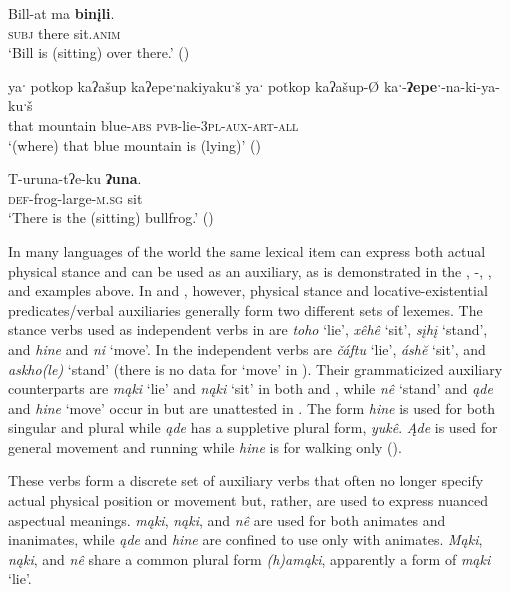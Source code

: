 \documentclass[output=paper]{LSP/langsci}
\begin{document}
\ea
\settowidth{}
\gll	Bill-at ma \textbf{binįli}.\\
	 \textsc{subj} there sit.\textsc{anim}\\ 
\glt `Bill is (sitting) over there.' (\citealt[21]{Watkins1976})
\z
		
\ea	
\settowidth{} 
yaˑ potkop kaʔašup kaʔepeˑnakiyakuˑš 
\gll		yaˑ potkop kaʔašup-Ø kaˑ-\textbf{ʔepeˑ}-na-ki-ya-kuˑš\\
		that mountain blue-\textsc{abs} \textsc{pvb}-lie-\textsc{3pl-aux-art-all}\\
\glt	`(where) that blue mountain is (lying)' (\citealt[438]{Kimball2005})
\z

\ea
\settowidth{}
\gll	T-uruna-tʔe-ku 	\textbf{ʔuna}.\\
 \textsc{def}-frog-large-\textsc{m.sg} sit\\ 
\glt `There is the (sitting) bullfrog.' (\citealt[26]{Watkins1976})
\z

In many languages of the world the same lexical item can express both actual physical stance and can be used as an auxiliary, as is demonstrated in the , -, , and  examples above. In  and , however, physical stance and locative-existential predicates/verbal auxiliaries generally form two different sets of lexemes. The stance verbs used as independent verbs in  are \emph{toho} `lie', \emph{xêhê} `sit', \emph{sįhį} `stand', and \emph{hine} and \emph{ni} `move'. In  the independent verbs are \emph{čáftu} `lie', \emph{áshĕ} `sit', and \emph{askho(le)} `stand' (there is no data for `move' in ). Their grammaticized auxiliary counterparts are \emph{mąki} `lie' and \emph{nąki} `sit' in both  and , while \emph{nê} `stand' and \emph{ąde} and \emph{hine} `move' occur in  but are unattested in . The  form \emph{hine} is used for both singular and plural while \emph{ąde} has a suppletive plural form, \emph{yukê}. \emph{Ąde} is used for general movement and running while \emph{hine} is for walking only (\citealt[3]{Kaufman2013}). 

These verbs form a discrete set of auxiliary verbs that often no longer specify actual physical position or movement but, rather, are used to express nuanced aspectual meanings.  \emph{mąki}, \emph{nąki}, and \emph{nê} are used for both animates and inanimates, while \emph{ąde} and \emph{hine} are confined to use only with animates. \emph{Mąki}, \emph{nąki}, and \emph{nê} share a common plural form \emph{(h)amąki}, apparently a form of \emph{mąki} `lie'. 
 
\end{document}
